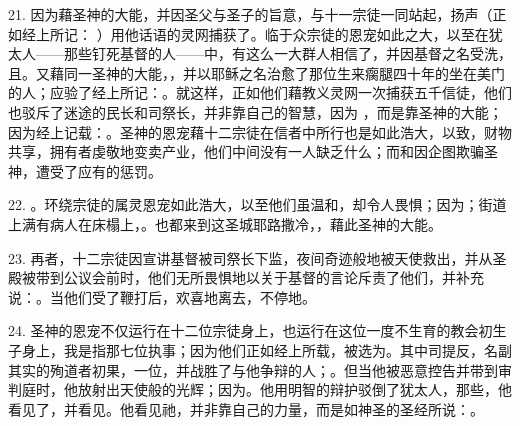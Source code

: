 21. 因为藉圣神的大能，并因圣父与圣子的旨意，与十一宗徒一同站起，扬声（正如经上所记： ）用他话语的灵网捕获了。临于众宗徒的恩宠如此之大，以至在犹太人——那些钉死基督的人——中，有这么一大群人相信了，并因基督之名受洗，且。又藉同一圣神的大能，，并以耶稣之名治愈了那位生来瘸腿四十年的坐在美门的人；应验了经上所记：。就这样，正如他们藉教义灵网一次捕获五千信徒，他们也驳斥了迷途的民长和司祭长，并非靠自己的智慧，因为 ，而是靠圣神的大能；因为经上记载：。圣神的恩宠藉十二宗徒在信者中所行也是如此浩大，以致，财物共享，拥有者虔敬地变卖产业，他们中间没有一人缺乏什么；而和因企图欺骗圣神，遭受了应有的惩罚。\par

22. 。环绕宗徒的属灵恩宠如此浩大，以至他们虽温和，却令人畏惧；因为；街道上满有病人在床榻上，。也都来到这圣城耶路撒冷，，藉此圣神的大能。\par

23. 再者，十二宗徒因宣讲基督被司祭长下监，夜间奇迹般地被天使救出，并从圣殿被带到公议会前时，他们无所畏惧地以关于基督的言论斥责了他们，并补充说：。当他们受了鞭打后，欢喜地离去，不停地。\par

24. 圣神的恩宠不仅运行在十二位宗徒身上，也运行在这位一度不生育的教会初生子身上，我是指那七位执事；因为他们正如经上所载，被选为。其中司提反，名副其实的殉道者初果，一位，并战胜了与他争辩的人；。但当他被恶意控告并带到审判庭时，他放射出天使般的光辉；因为。他用明智的辩护驳倒了犹太人，那些，他看见了，并看见。他看见祂，并非靠自己的力量，而是如神圣的圣经所说：。\par

